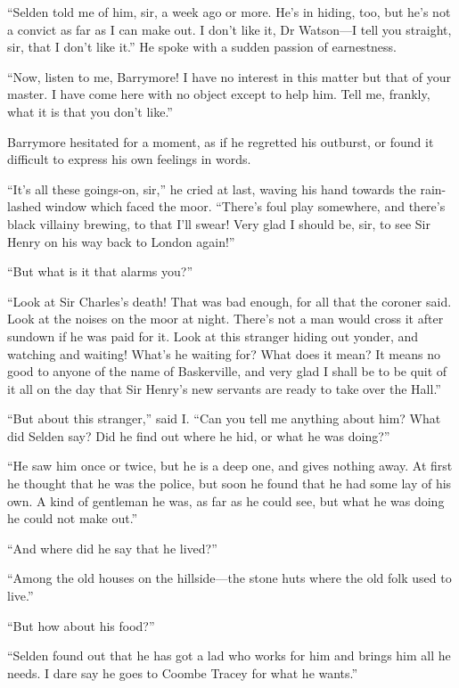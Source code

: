 \documentclass[paper=5.5in:8.5in,BCOR=7mm,twoside,DIV=calc,12pt,usegeometry,openany,chapterprefix,endperiod,headings=big]{scrbook} %
\begin{document}
\enquote{Selden told me of him, sir, a week ago or more. He's in hiding, too, but he's not a convict as far as I can make out. I don't like it, Dr Watson---I tell you straight, sir, that I don't like it.} He spoke with a sudden passion of earnestness.

\enquote{Now, listen to me, Barrymore! I have no interest in this matter but that of your master. I have come here with no object except to help him. Tell me, frankly, what it is that you don't like.}

Barrymore hesitated for a moment, as if he regretted his outburst, or found it difficult to express his own feelings in words.

\enquote{It's all these goings-on, sir,} he cried at last, waving his hand towards the rain-lashed window which faced the moor. \enquote{There's foul play somewhere, and there's black villainy brewing, to that I'll swear! Very glad I should be, sir, to see Sir Henry on his way back to London again!}

\enquote{But what is it that alarms you?}

\enquote{Look at Sir Charles's death! That was bad enough, for all that the coroner said. Look at the noises on the moor at night. There's not a man would cross it after sundown if he was paid for it. Look at this stranger hiding out yonder, and watching and waiting! What's he waiting for? What does it mean? It means no good to anyone of the name of Baskerville, and very glad I shall be to be quit of it all on the day that Sir Henry's new servants are ready to take over the Hall.}

\enquote{But about this stranger,} said I. \enquote{Can you tell me anything about him? What did Selden say? Did he find out where he hid, or what he was doing?}

\enquote{He saw him once or twice, but he is a deep one, and gives nothing away. At first he thought that he was the police, but soon he found that he had some lay of his own. A kind of gentleman he was, as far as he could see, but what he was doing he could not make out.}

\enquote{And where did he say that he lived?}

\enquote{Among the old houses on the hillside---the stone huts where the old folk used to live.}

\enquote{But how about his food?}

\enquote{Selden found out that he has got a lad who works for him and brings him all he needs. I dare say he goes to Coombe Tracey for what he wants.}
\end{document}
